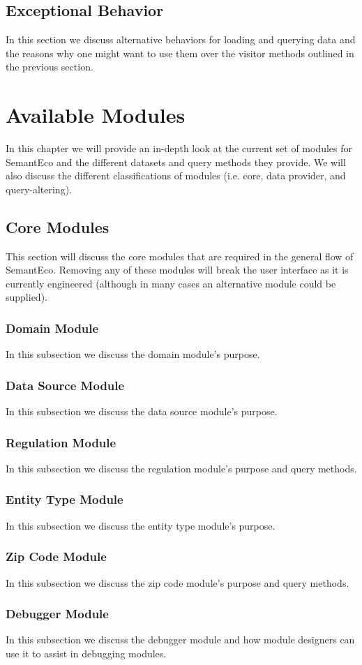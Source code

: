 \documentclass[letterpaper]{report}
\begin{document}
\section{Exceptional Behavior}
In this section we discuss alternative behaviors for loading and querying data and the reasons why one might want to use them over the visitor methods outlined in the previous section.
\chapter{Available Modules}
In this chapter we will provide an in-depth look at the current set of modules for SemantEco and the different datasets and query methods they provide. We will also discuss the different classifications of modules (i.e. core, data provider, and query-altering).
\section{Core Modules}
This section will discuss the core modules that are required in the general flow of SemantEco. Removing any of these modules will break the user interface as it is currently engineered (although in many cases an alternative module could be supplied).
\subsection{Domain Module}
In this subsection we discuss the domain module's purpose.
\subsection{Data Source Module}
In this subsection we discuss the data source module's purpose.
\subsection{Regulation Module}
In this subsection we discuss the regulation module's purpose and query methods.
\subsection{Entity Type Module}
In this subsection we discuss the entity type module's purpose.
\subsection{Zip Code Module}
In this subsection we discuss the zip code module's purpose and query methods.
\subsection{Debugger Module}
In this subsection we discuss the debugger module and how module designers can use it to assist in debugging modules.
\end{document}
